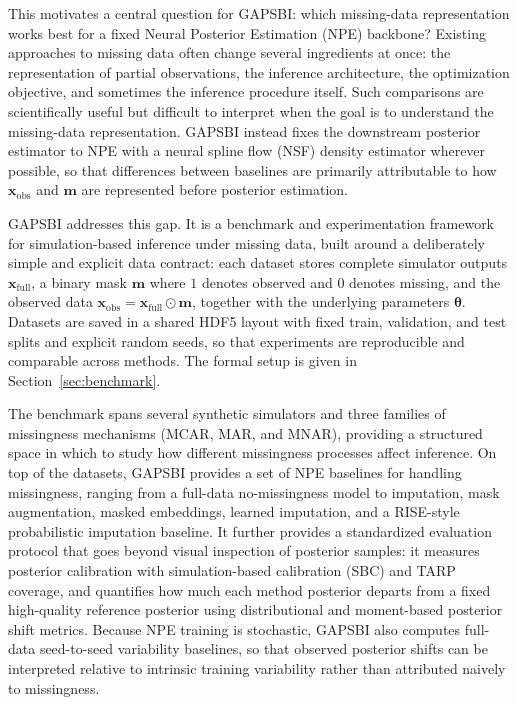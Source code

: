 \documentclass{article} %
\providecommand{\xfull}{\mathbf{x}_{\mathrm{full}}}
\providecommand{\xobs}{\mathbf{x}_{\mathrm{obs}}}
\providecommand{\mvec}{\mathbf{m}}
\providecommand{\thetab}{\boldsymbol{\theta}}
\begin{document}
This motivates a central question for GAPSBI: which missing-data representation
works best for a fixed Neural Posterior Estimation (NPE) backbone? Existing
approaches to missing data often change several ingredients at once: the
representation of partial observations, the inference architecture, the
optimization objective, and sometimes the inference procedure itself. Such
comparisons are scientifically useful but difficult to interpret when the goal is
to understand the missing-data representation. GAPSBI instead fixes the
downstream posterior estimator to NPE with a neural spline flow (NSF) density
estimator wherever possible, so that differences between baselines are primarily
attributable to how $\xobs$ and $\mvec$ are represented before posterior
estimation.

GAPSBI addresses this gap. It is a benchmark and experimentation framework for
simulation-based inference under missing data, built around a deliberately simple
and explicit data contract: each dataset stores complete simulator outputs
$\xfull$, a binary mask $\mvec$ where $1$ denotes observed and $0$ denotes
missing, and the observed data $\xobs = \xfull \odot \mvec$, together with the
underlying parameters $\thetab$. Datasets are saved in a shared HDF5 layout with
fixed train, validation, and test splits and explicit random seeds, so that
experiments are reproducible and comparable across methods. The formal setup is
given in Section~\ref{sec:benchmark}.

The benchmark spans several synthetic simulators and three families of missingness
mechanisms (MCAR, MAR, and MNAR), providing a structured space in which to study
how different missingness processes affect inference. On top of the datasets,
GAPSBI provides a set of NPE baselines for handling missingness, ranging from a
full-data no-missingness model to imputation, mask augmentation, masked embeddings,
learned imputation, and a RISE-style probabilistic imputation baseline. It
further provides a standardized evaluation protocol that goes
beyond visual inspection of posterior samples: it measures posterior calibration
with simulation-based calibration (SBC) and TARP coverage, and quantifies how
much each method posterior departs from a fixed high-quality reference posterior using
distributional and moment-based posterior shift metrics. Because NPE training is
stochastic, GAPSBI also computes full-data seed-to-seed variability baselines,
so that observed posterior shifts can be interpreted relative to intrinsic
training variability rather than attributed naively to missingness.
\end{document}
